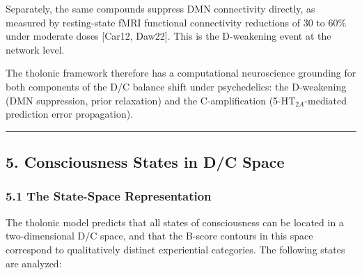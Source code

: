 \documentclass[
  11pt,
  letterpaper,
]{article}
\begin{document}
Separately, the same compounds suppress DMN connectivity directly, as
measured by resting-state fMRI functional connectivity reductions of 30
to 60\% under moderate doses {[}Car12, Daw22{]}. This is the D-weakening
event at the network level.

The tholonic framework therefore has a computational neuroscience
grounding for both components of the D/C balance shift under
psychedelics: the D-weakening (DMN suppression, prior relaxation) and
the C-amplification (5-HT\(_{2A}\)-mediated prediction error
propagation).

\begin{center}\rule{0.5\linewidth}{0.5pt}\end{center}

\subsection{5. Consciousness States in D/C
Space}\label{consciousness-states-in-dc-space}

\subsubsection{5.1 The State-Space
Representation}\label{the-state-space-representation}

The tholonic model predicts that all states of consciousness can be
located in a two-dimensional D/C space, and that the B-score contours in
this space correspond to qualitatively distinct experiential categories.
The following states are analyzed:
\end{document}
